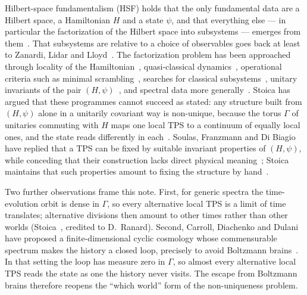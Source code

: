 \documentclass[11pt]{article}
\theoremstyle{definition}
\theoremstyle{remark}
\begin{document}
Hilbert-space fundamentalism (HSF) holds that the only fundamental data are a Hilbert space, a Hamiltonian $H$ and a state $\psi$, and that everything else --- in particular the factorization of the Hilbert space into subsystems --- emerges from them~\cite{CarrollSingh2021,Stoica2022}. That subsystems are relative to a choice of observables goes back at least to Zanardi, Lidar and Lloyd~\cite{ZLL2004}. The factorization problem has been approached through locality of the Hamiltonian~\cite{CPR2019}, quasi-classical dynamics~\cite{CarrollSingh2021}, operational criteria such as minimal scrambling~\cite{Zanardi2024}, searches for classical subsystems~\cite{Adil2024}, unitary invariants of the pair $(H,\psi)$~\cite{Soulas2025}, and spectral data more generally~\cite{LoizeauSels2024,Cao2026,Kushwaha2026}. Stoica has argued that these programmes cannot succeed as stated: any structure built from $(H,\psi)$ alone in a unitarily covariant way is non-unique, because the torus $\Gamma$ of unitaries commuting with $H$ maps one local TPS to a continuum of equally local ones, and the state reads differently in each~\cite{Stoica2022,Stoica2024,Stoica2026}. Soulas, Franzmann and Di Biagio have replied that a TPS can be fixed by suitable invariant properties of $(H,\psi)$, while conceding that their construction lacks direct physical meaning~\cite{Soulas2025}; Stoica maintains that such properties amount to fixing the structure by hand~\cite{Stoica2026comment}.

Two further observations frame this note. First, for generic spectra the time-evolution orbit is dense in $\Gamma$, so every alternative local TPS is a limit of time translates; alternative divisions then amount to other times rather than other worlds (Stoica~\cite[Remark~11]{Stoica2022}, credited to D.~Ranard). Second, Carroll, Diachenko and Dulani have proposed a finite-dimensional cyclic cosmology whose commensurable spectrum makes the history a closed loop, precisely to avoid Boltzmann brains~\cite{CDD2026}. In that setting the loop has measure zero in $\Gamma$, so almost every alternative local TPS reads the state as one the history never visits. The escape from Boltzmann brains therefore reopens the ``which world'' form of the non-uniqueness problem.
\end{document}
